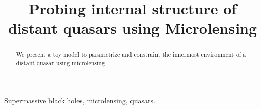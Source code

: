 \documentclass[usenatbib,twocolumn]{mn2e}
\title{Probing internal structure of distant quasars using Microlensing}
\begin{document}
\maketitle

\begin{abstract}
We present a toy model to parametrize and constraint the innermost environment of a distant quasar using microlensing. 
\end{abstract}


\begin{keywords}
Supermassive black holes, microlensing, quasars.
\end{keywords}













\citep{2006MNRAS.367.1209L}





\def\apj{ApJ}
\def\apjl{ApJL}
\def\aj{AJ}
\def\mnras{MNRAS}
\def\aap{A\&A}


\end{document}

